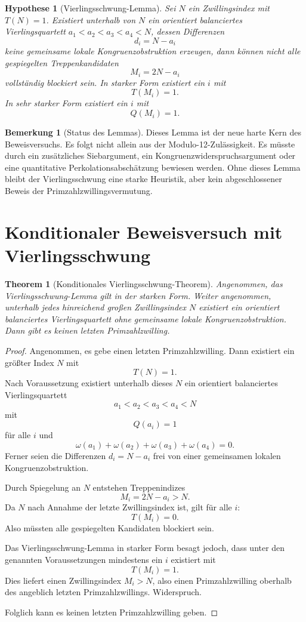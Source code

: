 \documentclass[11pt,a4paper]{article}
\newtheorem{theorem}{Theorem}
\newtheorem{hypothesis}{Hypothese}
\theoremstyle{definition}
\newtheorem{remark}{Bemerkung}
\begin{document}
\begin{hypothesis}[Vierlingsschwung-Lemma]
Sei $N$ ein Zwillingsindex mit $T(N)=1$. Existiert unterhalb von $N$ ein orientiert balanciertes Vierlingsquartett $a_1<a_2<a_3<a_4<N$, dessen Differenzen
\[
d_i=N-a_i
\]
keine gemeinsame lokale Kongruenzobstruktion erzeugen, dann können nicht alle gespiegelten Treppenkandidaten
\[
M_i=2N-a_i
\]
vollständig blockiert sein. In starker Form existiert ein $i$ mit
\[
T(M_i)=1.
\]
In sehr starker Form existiert ein $i$ mit
\[
Q(M_i)=1.
\]
\end{hypothesis}

\begin{remark}[Status des Lemmas]
Dieses Lemma ist der neue harte Kern des Beweisversuchs. Es folgt nicht allein aus der Modulo-12-Zulässigkeit. Es müsste durch ein zusätzliches Siebargument, ein Kongruenzwiderspruchsargument oder eine quantitative Perkolationsabschätzung bewiesen werden. Ohne dieses Lemma bleibt der Vierlingsschwung eine starke Heuristik, aber kein abgeschlossener Beweis der Primzahlzwillingsvermutung.
\end{remark}

\section{Konditionaler Beweisversuch mit Vierlingsschwung}

\begin{theorem}[Konditionales Vierlingsschwung-Theorem]
Angenommen, das Vierlingsschwung-Lemma gilt in der starken Form. Weiter angenommen, unterhalb jedes hinreichend großen Zwillingsindex $N$ existiert ein orientiert balanciertes Vierlingsquartett ohne gemeinsame lokale Kongruenzobstruktion. Dann gibt es keinen letzten Primzahlzwilling.
\end{theorem}

\begin{proof}
Angenommen, es gebe einen letzten Primzahlzwilling. Dann existiert ein größter Index $N$ mit
\[
T(N)=1.
\]
Nach Voraussetzung existiert unterhalb dieses $N$ ein orientiert balanciertes Vierlingsquartett
\[
a_1<a_2<a_3<a_4<N
\]
mit
\[
Q(a_i)=1
\]
für alle $i$ und
\[
\omega(a_1)+\omega(a_2)+\omega(a_3)+\omega(a_4)=0.
\]
Ferner seien die Differenzen $d_i=N-a_i$ frei von einer gemeinsamen lokalen Kongruenzobstruktion.

Durch Spiegelung an $N$ entstehen Treppenindizes
\[
M_i=2N-a_i>N.
\]
Da $N$ nach Annahme der letzte Zwillingsindex ist, gilt für alle $i$:
\[
T(M_i)=0.
\]
Also müssten alle gespiegelten Kandidaten blockiert sein.

Das Vierlingsschwung-Lemma in starker Form besagt jedoch, dass unter den genannten Voraussetzungen mindestens ein $i$ existiert mit
\[
T(M_i)=1.
\]
Dies liefert einen Zwillingsindex $M_i>N$, also einen Primzahlzwilling oberhalb des angeblich letzten Primzahlzwillings. Widerspruch.

Folglich kann es keinen letzten Primzahlzwilling geben.
\end{proof}
\end{document}
